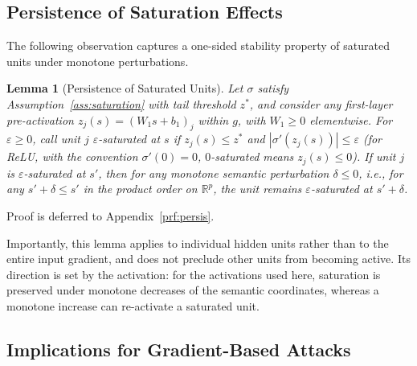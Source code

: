 \documentclass{article}
\theoremstyle{plain}
\newtheorem{lemma}[theorem]{Lemma}
\theoremstyle{definition}
\theoremstyle{remark}
\begin{document}
\subsection{Persistence of Saturation Effects}

The following observation captures a one-sided stability property of saturated
units under monotone perturbations.

\begin{lemma}[Persistence of Saturated Units]
\label{lem:persistence}
Let $\sigma$ satisfy Assumption~\ref{ass:saturation} with tail threshold $z^\ast$,
and consider any first-layer pre-activation $z_j(s)= (W_1 s + b_1)_j$ within $g$,
with $W_1\ge 0$ elementwise. For $\varepsilon \ge 0$, call unit $j$
\emph{$\varepsilon$-saturated} at $s$ if $z_j(s) \le z^\ast$ and
$|\sigma'(z_j(s))| \le \varepsilon$ (for ReLU, with the convention $\sigma'(0)=0$,
$0$-saturated means $z_j(s) \le 0$). If unit $j$ is $\varepsilon$-saturated at $s'$,
then for any monotone semantic perturbation $\delta \le 0$, i.e., for any
$s' + \delta \le s'$ in the product order on $\mathbb{R}^p$, the unit remains
$\varepsilon$-saturated at $s'+\delta$.
\end{lemma}


Proof is deferred to Appendix~\ref{prf:persis}.

Importantly, this lemma applies to individual hidden units rather than to the
entire input gradient, and does not preclude other units from becoming active.
Its
direction is set by the activation: for the activations used here, saturation is
preserved under monotone decreases of the semantic coordinates, whereas a monotone
increase can re-activate a saturated unit.
\subsection{Implications for Gradient-Based Attacks}
\end{document}

